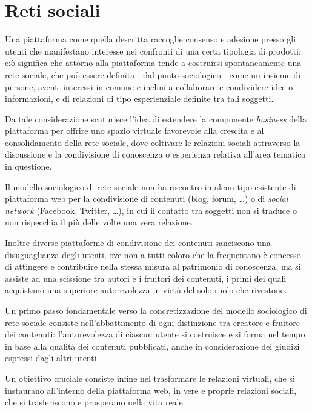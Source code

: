\section{Reti sociali}
\label{sec:progetto:reti-sociali}
Una piattaforma come quella descritta raccoglie consenso e adesione presso gli utenti che manifestano interesse nei confronti di una certa tipologia di prodotti: ciò significa che attorno alla piattaforma tende a costruirsi spontaneamente una \underline{rete sociale}, che può essere definita - dal punto sociologico - come un insieme di persone, aventi interessi in comune e inclini a collaborare e condividere idee o informazioni, e di relazioni di tipo esperienziale definite tra tali soggetti.

Da tale considerazione scaturisce l'idea di estendere la componente \textit{business} della piattaforma per offrire uno spazio virtuale favorevole alla crescita e al consolidamento della rete sociale, dove coltivare le relazioni sociali attraverso la discussione e la condivisione di conoscenza o esperienza relativa all'area tematica in questione.

Il modello sociologico di rete sociale non ha riscontro in alcun tipo esistente di piattaforma web per la condivisione di contenuti (blog, forum, \ldots) o di \textit{social network} (Facebook, Twitter, \ldots), in cui il contatto tra soggetti non si traduce o non rispecchia il più delle volte una vera relazione.

Inoltre diverse piattaforme di condivisione dei contenuti sanciscono una disuguaglianza degli utenti, ove non a tutti coloro che la frequentano è concesso di attingere e contribuire nella stessa misura al patrimonio di conoscenza, ma si assiste ad una scissione tra autori e i fruitori dei contenuti, i primi dei quali acquistano una superiore autorevolezza in virtù del solo ruolo che rivestono.

Un primo passo fondamentale verso la concretizzazione del modello sociologico di rete sociale consiste nell'abbattimento di ogni distinzione tra creatore e fruitore dei contenuti: l'autorevolezza di ciascun utente si costruisce e si forma nel tempo in base alla qualità dei contenuti pubblicati, anche in considerazione dei giudizi espressi dagli altri utenti.

Un obiettivo cruciale consiste infine nel trasformare le relazioni virtuali, che si instaurano all'interno della piattaforma web, in vere e proprie relazioni sociali, che si trasferiscono e prosperano nella vita reale.

